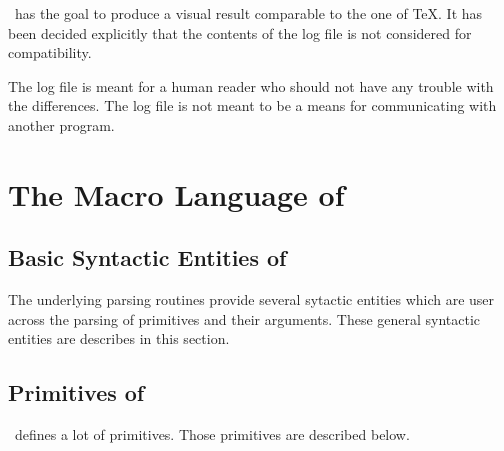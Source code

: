 \documentclass{extex-doc}
\begin{document}
\ExTeX\ has the goal to produce a visual result comparable to the one
of \TeX. It has been decided explicitly that the
contents of the log file is not considered for
compatibility.

The log file is meant for a human reader who should not have any
trouble with the differences. The log file is not meant to be a means
for communicating with another program.


\chapter{The Macro Language of \ExTeX}

\section{Basic Syntactic Entities of \ExTeX}

The underlying parsing routines provide several sytactic entities
which are user across the parsing of primitives and their arguments.
These general syntactic entities are describes in this section.


\section{Primitives of \ExTeX}

\ExTeX\ defines a lot of primitives. Those primitives are described below.



\appendix



{\scriptsize\printindex}
\end{document}
